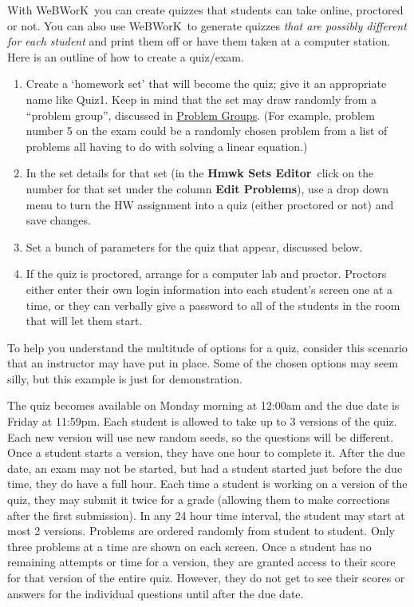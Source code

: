 \documentclass[12pt]{article}
\newcommand{\menu}[1]{\textbf{#1}}
\newcommand{\WW}{WeBWorK}
\newcommand{\HSE}{\menu{Hmwk Sets Editor}}
\begin{document}
With \WW\ you can create quizzes that students can take online, proctored or not. You can also use \WW\ to generate quizzes \emph{that are possibly different for each student} and print them off or have them taken at a computer station. Here is an outline of how to create a quiz/exam.
\begin{enumerate}
\item Create a `homework set' that will become the quiz; give it an appropriate name like Quiz1. Keep in mind that the set may draw randomly from a ``problem group'', discussed in \hyperref[groups]{Problem Groups}. (For example, problem number 5 on the exam could be a randomly chosen problem from a list of problems all having to do with solving a linear equation.)
\item In the set details for that set (in the \HSE\ click on the number for that set under the column \menu{Edit Problems}), use a drop down menu to turn the HW assignment into a quiz (either proctored or not) and save changes.
\item Set a bunch of parameters for the quiz that appear, discussed below.
\item If the quiz is proctored, arrange for a computer lab and proctor. Proctors either enter their own login information into each student's screen one at a time, or they can verbally give a password to all of the students in the room that will let them start.
\end{enumerate}

To help you understand the multitude of options for a quiz, consider this scenario that an instructor may have put in place. Some of the chosen options may seem silly, but this example is just for demonstration. 

\hfill\begin{minipage}{0.9\textwidth}
The quiz becomes available on Monday morning at 12:00{\sc am} and the due date is Friday at 11:59{\sc pm}. Each student is allowed to take up to 3 versions of the quiz. Each new version will use new random seeds, so the questions will be different. Once a student starts a version, they have one hour to complete it. After the due date, an exam may not be started, but had a student started just before the due time, they do have a full hour.  Each time a student is working on a version of the quiz, they may submit it twice for a grade (allowing them to make corrections after the first submission).  In any 24 hour time interval, the student may start at most 2 versions. Problems are ordered randomly from student to student. Only three problems at a time are shown on each screen. Once a student has no remaining attempts or time for a version, they are granted access to their score for that version of the entire quiz. However, they do not get to see their scores or answers for the individual questions until after the due date.
\end{minipage}
\end{document}
